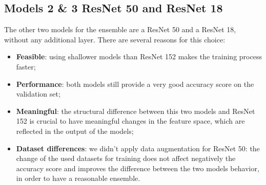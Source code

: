 \documentclass[11pt, journal]{IEEEtran}
\begin{document}
\subsection*{Models 2 \texorpdfstring{\&}{&} 3 \texorpdfstring{\textbullet}{•} ResNet 50 and ResNet 18}

The other two models for the ensemble are a ResNet 50 and a ResNet 18, without any additional layer. There are several reasons for this choice:
\begin{itemize}
    \item \textbf{Feasible}: using shallower models than ResNet 152 makes the training process faster;
    \item \textbf{Performance}: both models still provide a very good accuracy score on the validation set; %
    \item \textbf{Meaningful}: the structural difference between this two models and ResNet 152 is crucial to have meaningful changes in the feature space, which are reflected in the output of the models;
    \item \textbf{Dataset differences}: we didn't apply data augmentation for ResNet 50: the change of the used datasets for training does not affect negatively the accuracy score and improves the difference between the two models behavior, in order to have a reasonable ensemble. 
\end{itemize}


\end{document}
